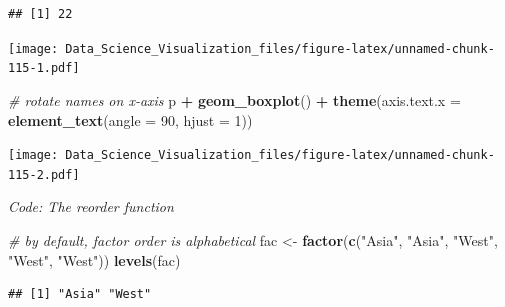 \documentclass[
]{article}
\newenvironment{Shaded}{\begin{snugshade}}{\end{snugshade}}
\newcommand{\CommentTok}[1]{\textcolor[rgb]{0.56,0.35,0.01}{\textit{#1}}}
\newcommand{\DataTypeTok}[1]{\textcolor[rgb]{0.13,0.29,0.53}{#1}}
\newcommand{\DecValTok}[1]{\textcolor[rgb]{0.00,0.00,0.81}{#1}}
\newcommand{\KeywordTok}[1]{\textcolor[rgb]{0.13,0.29,0.53}{\textbf{#1}}}
\newcommand{\NormalTok}[1]{#1}
\newcommand{\OperatorTok}[1]{\textcolor[rgb]{0.81,0.36,0.00}{\textbf{#1}}}
\newcommand{\StringTok}[1]{\textcolor[rgb]{0.31,0.60,0.02}{#1}}
\begin{document}
\begin{verbatim}
## [1] 22
\end{verbatim}

\begin{Shaded}
\end{Shaded}

\texttt{[image: Data\_Science\_Visualization\_files/figure-latex/unnamed-chunk-115-1.pdf]}

\begin{Shaded}
\begin{Highlighting}[]
\CommentTok{# rotate names on x-axis}
\NormalTok{p }\OperatorTok{+}\StringTok{ }\KeywordTok{geom_boxplot}\NormalTok{() }\OperatorTok{+}
\StringTok{    }\KeywordTok{theme}\NormalTok{(}\DataTypeTok{axis.text.x =} \KeywordTok{element_text}\NormalTok{(}\DataTypeTok{angle =} \DecValTok{90}\NormalTok{, }\DataTypeTok{hjust =} \DecValTok{1}\NormalTok{))}
\end{Highlighting}
\end{Shaded}

\texttt{[image: Data\_Science\_Visualization\_files/figure-latex/unnamed-chunk-115-2.pdf]}

\emph{Code: The reorder function}

\begin{Shaded}
\begin{Highlighting}[]
\CommentTok{# by default, factor order is alphabetical}
\NormalTok{fac <-}\StringTok{ }\KeywordTok{factor}\NormalTok{(}\KeywordTok{c}\NormalTok{(}\StringTok{"Asia"}\NormalTok{, }\StringTok{"Asia"}\NormalTok{, }\StringTok{"West"}\NormalTok{, }\StringTok{"West"}\NormalTok{, }\StringTok{"West"}\NormalTok{))}
\KeywordTok{levels}\NormalTok{(fac)}
\end{Highlighting}
\end{Shaded}

\begin{verbatim}
## [1] "Asia" "West"
\end{verbatim}
\end{document}
